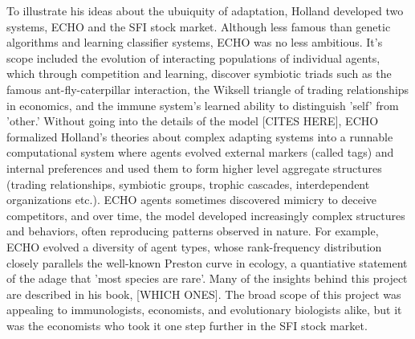 \documentclass{sig-alternate}
\begin{document}
To illustrate his ideas about the ubuiquity of adaptation, Holland developed two systems, ECHO and the SFI stock market.
Although less famous than genetic algorithms and learning classifier systems, ECHO was no less ambitious.  It's scope included the evolution of interacting populations of individual agents, which through competition and learning, discover symbiotic triads such as the famous ant-fly-caterpillar interaction,  the Wiksell triangle of trading relationships in economics, and the immune system's learned ability to distinguish 'self' from 'other.'  Without going into the details of the model [CITES HERE], ECHO formalized Holland's theories about complex adapting systems into a runnable computational system where agents evolved external markers (called tags) and internal preferences and used them to form higher level aggregate structures (trading relationships, symbiotic groups, trophic cascades, interdependent organizations etc.).  ECHO agents sometimes discovered mimicry to deceive competitors, and over time, the model developed increasingly complex structures and behaviors, often reproducing patterns observed in nature.  For example,  ECHO evolved a diversity of agent types, whose rank-frequency distribution closely parallels the well-known Preston curve in ecology, a quantiative statement of the adage that 'most species are rare'. Many of the insights behind this project are described in his book, [WHICH ONES]. The broad scope of this project was appealing to immunologists, economists, and evolutionary biologists alike, but it was the economists who took it one step further in the SFI stock market.

\end{document}
